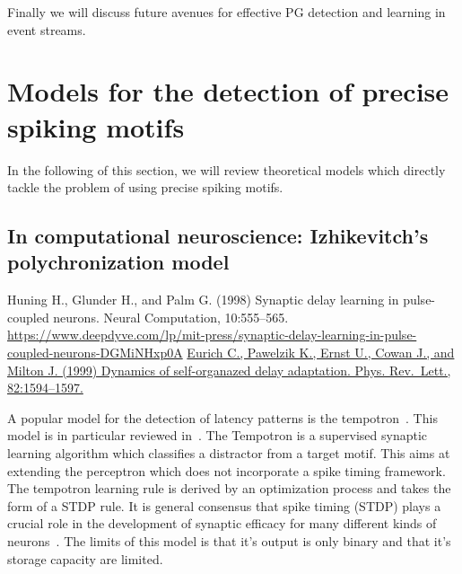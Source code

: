 \documentclass[brainsci, %
               review,submit,pdftex,moreauthors]{Definitions/mdpi}
\begin{document}
Finally we will discuss future avenues for effective PG detection and learning in event streams.


\section{Models for the detection of precise spiking motifs}\label{sec:detection}
In the following of this section, we will review theoretical models which directly tackle the problem of using precise spiking motifs.
\subsection{In computational neuroscience: Izhikevitch's polychronization model}


    Huning H., Glunder H., and Palm G. (1998) Synaptic delay learning in pulse-coupled neurons. Neural Computation, 10:555--565. \url{https://www.deepdyve.com/lp/mit-press/synaptic-delay-learning-in-pulse-coupled-neurons-DGMiNHxp0A}
    \href{https://www.researchgate.net/publication/37921636_Dynamics_of_Self-Organized_Delay_Adaptation}{Eurich C., Pawelzik K., Ernst U., Cowan J., and Milton J. (1999) Dynamics of self-organazed delay adaptation. Phys. Rev.~Lett., 82:1594--1597.}
  
A popular model for the detection of latency patterns is the tempotron~\citep{gutig_tempotron_2006}. This model is in particular reviewed in~\citep{gutig_spike_2014}. The Tempotron is a supervised synaptic learning algorithm which classifies a distractor from a target motif. This aims at extending the perceptron which does not incorporate a spike timing framework. The tempotron learning rule is derived by an optimization process and takes the form of a STDP rule. It is general consensus that spike timing (STDP) plays a crucial role in the development of synaptic efficacy for many different kinds of neurons~\citep{caporale_spike_2008}. The limits of this model is that it's output is only binary and that it's storage capacity are limited.
\end{document}
